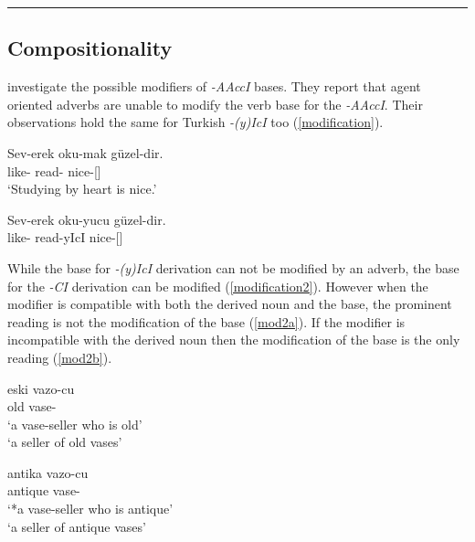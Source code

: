     \rule{\columnwidth}{0.4pt}
    
    
    \subsection{Compositionality}
    
    \cite{baker2009agent} investigate the possible modifiers of \textit{-AAccI} bases. They report that agent oriented adverbs are unable to modify the verb base for the \textit{-AAccI}. Their observations hold the same for Turkish \textit{-(y)IcI} too (\ref{modification}).
    
    \begin{exe}
    \ex \label{modification}
    \begin{xlist}
    \ex \gll Sev-erek oku-mak güzel-dir. \\ like-{\Cvb} read-{\Nmlz} nice-{\Cop}[{\Tsg}] \\
    \glt `Studying by heart is nice.'
    
    \ex \gll *Sev-erek oku-yucu güzel-dir. \\ like-{\Cvb} read-yIcI nice-{\Cop}[{\Tsg}] \\
    \end{xlist}
    \end{exe}
    
    While the base for \textit{-(y)IcI} derivation can not be modified by an adverb, the base for the \textit{-CI} derivation can be modified (\ref{modification2}). However when the modifier is compatible with both the derived noun and the base, the prominent reading is not the modification of the base (\ref{mod2a}). If the modifier is incompatible with the derived noun then the modification of the base is the only reading (\ref{mod2b}).
    
    
    \begin{exe}
    \ex \label{modification2}
\begin{multicols}{2}  
    \begin{xlist}
    \ex \label{mod2a} \gll eski vazo-cu \\ old vase-{\Ci} \\ 
    \glt `a vase-seller who is old' \\ `a seller of old vases'

    \ex \label{mod2b} \gll antika vazo-cu \\ antique vase-{\Ci} \\ 
    \glt`*a vase-seller who is antique' \\ `a seller of antique vases'
    

    \end{xlist}
\end{multicols}
    \end{exe}

